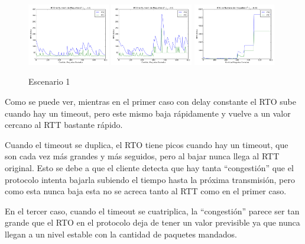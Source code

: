         \begin{figure}[H]
            \center
	        
		    \includegraphics[width=0.32\textwidth]{imagenes/congestion_1.pdf}
		    \includegraphics[width=0.32\textwidth]{imagenes/congestion_2.pdf}
		    \includegraphics[width=0.32\textwidth]{imagenes/congestion_4.pdf}

            \caption*{Escenario 1}
	
        \end{figure}          

		Como se puede ver, mientras en el primer caso con delay constante el RTO
		sube cuando hay un timeout, pero este mismo baja r\'apidamente y vuelve
		a un valor cercano al RTT bastante r\'apido.

		Cuando el timeout se duplica, el RTO tiene picos cuando hay un timeout,
		que son cada vez m\'as grandes y m\'as seguidos, pero al bajar nunca
		llega al RTT original. Esto se debe a que el cliente detecta que hay
		tanta ``congesti\'on'' que el protocolo intenta bajarla subiendo el
		tiempo hasta la pr\'oxima transmisi\'on, pero como esta nunca baja esta
		no se acreca tanto al RTT como en el primer caso.

		En el tercer caso, cuando el timeout se cuatriplica, la ``congesti\'on''
		parece ser tan grande que el RTO en el protocolo deja de tener un valor
		previsible ya que nunca llegan a un nivel estable con la cantidad de
		paquetes mandados.
  
